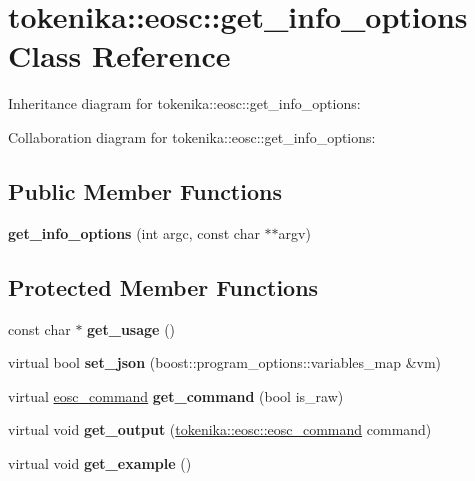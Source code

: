 \hypertarget{classtokenika_1_1eosc_1_1get__info__options}{}\section{tokenika\+:\+:eosc\+:\+:get\+\_\+info\+\_\+options Class Reference}
\label{classtokenika_1_1eosc_1_1get__info__options}


Inheritance diagram for tokenika\+:\+:eosc\+:\+:get\+\_\+info\+\_\+options\+:


Collaboration diagram for tokenika\+:\+:eosc\+:\+:get\+\_\+info\+\_\+options\+:
\subsection*{Public Member Functions}
\begin{DoxyCompactItemize}
\item 
\mbox{\label{classtokenika_1_1eosc_1_1get__info__options_ae17ddadfaae5f911806245ee343a7fe8}} 
{\bfseries get\+\_\+info\+\_\+options} (int argc, const char $\ast$$\ast$argv)
\end{DoxyCompactItemize}
\subsection*{Protected Member Functions}
\begin{DoxyCompactItemize}
\item 
\mbox{\label{classtokenika_1_1eosc_1_1get__info__options_a45505a16a760f2a46a4abca28e8c3f36}} 
const char $\ast$ {\bfseries get\+\_\+usage} ()
\item 
\mbox{\label{classtokenika_1_1eosc_1_1get__info__options_a53a235123f4c3e44714dfc9a73408b68}} 
virtual bool {\bfseries set\+\_\+json} (boost\+::program\+\_\+options\+::variables\+\_\+map \&vm)
\item 
\mbox{\label{classtokenika_1_1eosc_1_1get__info__options_a26d7097258a69f23293d23421fab84b0}} 
virtual \hyperlink{classtokenika_1_1eosc_1_1eosc__command}{eosc\+\_\+command} {\bfseries get\+\_\+command} (bool is\+\_\+raw)
\item 
\mbox{\label{classtokenika_1_1eosc_1_1get__info__options_aaae5074a608521882b86b8271f2296b9}} 
virtual void {\bfseries get\+\_\+output} (\hyperlink{classtokenika_1_1eosc_1_1eosc__command}{tokenika\+::eosc\+::eosc\+\_\+command} command)
\item 
\mbox{\label{classtokenika_1_1eosc_1_1get__info__options_a9410f7f01675b4333fed426a01f84163}} 
virtual void {\bfseries get\+\_\+example} ()
\end{DoxyCompactItemize}
